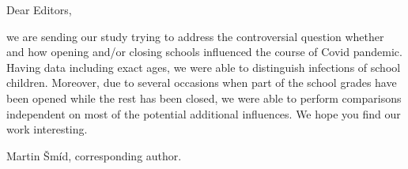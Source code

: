 \documentclass{letter}
\begin{document}
Dear Editors,

we are sending our study trying to address the controversial question whether and how opening and/or closing schools influenced the course of Covid pandemic. Having data including exact ages, we were able to distinguish infections of school children. Moreover, due to several occasions when part of the school grades have been opened while the rest has been closed, we were able to perform comparisons independent on most of the potential additional influences. We hope you find our work interesting.

Martin Šmíd, corresponding author.
\end{document}
